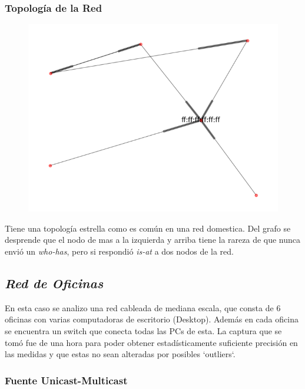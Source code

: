 \subsubsection{Topolog\'ia de la Red}
\begin{figure}[hp!]
	\begin{center}
	 \includegraphics[scale=0.6]{../plots/mauro_s2_topologia.png}
	\end{center}
\end{figure}

Tiene una topolog\'ia estrella como es común en una red domestica. Del grafo se desprende que el nodo de mas a la izquierda y
arriba tiene la rareza de que nunca envió un \textit{who-has}, pero si respondió \emph{is-at} a dos nodos de la red.

\subsection{\emph{Red de Oficinas}}

En esta caso se analizo una red cableada de mediana escala, que consta de 6
oficinas con varias computadoras de escritorio (Desktop). Además en cada
oficina se encuentra un switch que conecta todas las PCs de esta. La captura
que se tomó fue de una hora para poder obtener estadísticamente suficiente
precisión en las medidas y que estas no sean alteradas por posibles `outliers`.

\subsubsection{Fuente Unicast-Multicast}

